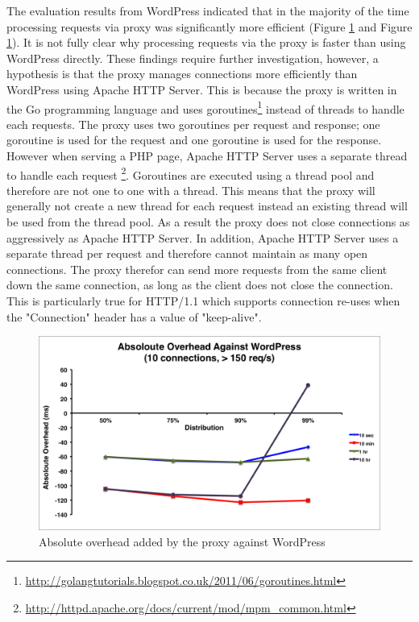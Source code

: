 \documentclass[a4paper,11pt,twoside]{report}
\begin{document}
The evaluation results from WordPress indicated that in the majority of the time processing requests via proxy was significantly more efficient (Figure \ref{absoloute-wordpress} and Figure \ref{absoloute-wordpress}). It is not fully clear why processing requests via the proxy is faster than using WordPress directly. These findings require further investigation, however, a hypothesis is that the proxy manages connections more efficiently than WordPress using Apache HTTP Server. This is because the proxy is written in the Go programming language and uses goroutines\footnote{\label{golangtutorials}\url{http://golangtutorials.blogspot.co.uk/2011/06/goroutines.html}}  instead of threads to handle each requests.  The proxy uses two goroutines per request and response; one goroutine is used for the request and one goroutine is used for the response. However when serving a PHP page, Apache HTTP Server uses a separate thread to handle each request \footnote{\label{apache_thread_per_req}\url{http://httpd.apache.org/docs/current/mod/mpm_common.html}}.  Goroutines are executed using a thread pool and therefore are not one to one with a thread. This means that the proxy will generally not create a new thread for each request instead an existing thread will be used from the thread pool. As a result the proxy does not close connections as aggressively as Apache HTTP Server.  In addition, Apache HTTP Server uses a separate thread per request and therefore cannot maintain as many open connections.  The proxy therefor can send more requests from the same client down the same connection, as long as the client does not close the connection. This is particularly true for HTTP/1.1 which supports connection re-uses when the "Connection" header has a value of "keep-alive".    

\begin{figure}[!ht]
  \centering
     \includegraphics[scale=0.55]{absoloute-wordpress}
  \caption{Absolute overhead added by the proxy against WordPress}
  \label{absoloute-wordpress}
\end{figure} 
\end{document}
